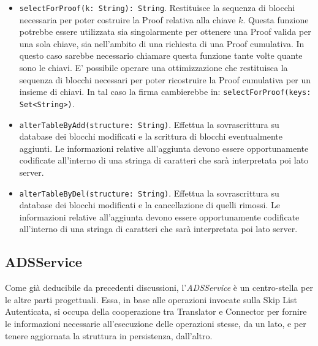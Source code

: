 \begin{itemize}
			\item \verb!selectForProof(k: String): String!. Restituisce la sequenza di blocchi necessaria per poter costruire la Proof relativa alla chiave $ k $. Questa funzione potrebbe essere utilizzata sia singolarmente per ottenere una Proof valida per una sola chiave, sia nell'ambito di una richiesta di una Proof cumulativa. In questo caso sarebbe necessario chiamare questa funzione tante volte quante sono le chiavi. E' possibile operare una ottimizzazione che restituisca la sequenza di blocchi necessari per poter ricostruire la Proof cumulativa per un insieme di chiavi. In tal caso la firma cambierebbe in: \verb!selectForProof(keys: Set<String>)!. 
			\item \verb!alterTableByAdd(structure: String)!. Effettua la sovrascrittura su database dei blocchi modificati e la scrittura di blocchi eventualmente aggiunti. Le informazioni relative all'aggiunta devono essere opportunamente codificate all'interno di una stringa di caratteri che sarà interpretata poi lato server.
			\item \verb!alterTableByDel(structure: String)!. Effettua la sovrascrittura su database dei blocchi modificati e la cancellazione di quelli rimossi. Le informazioni relative all'aggiunta devono essere opportunamente codificate all'interno di una stringa di caratteri che sarà interpretata poi lato server.	
		\end{itemize}
		
	
	\subsection{ADSService}
	

		Come già deducibile da precedenti discussioni, l'\textit{ADSService} è un centro-stella per le altre parti progettuali. Essa, in base alle operazioni invocate sulla Skip List Autenticata, si occupa della cooperazione tra Translator e Connector per fornire le informazioni necessarie all'esecuzione delle operazioni stesse, da un lato, e per tenere aggiornata la struttura in persistenza, dall'altro.
		

